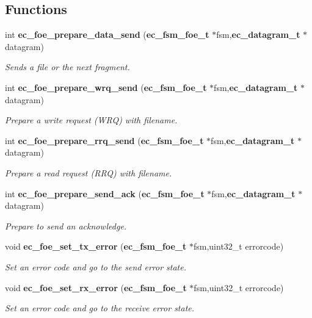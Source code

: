 \subsection*{Functions}
\begin{DoxyCompactItemize}
\item 
int {\bf ec\-\_\-foe\-\_\-prepare\-\_\-data\-\_\-send} ({\bf ec\-\_\-fsm\-\_\-foe\-\_\-t} $\ast$fsm,{\bf ec\-\_\-datagram\-\_\-t} $\ast$datagram)
\begin{DoxyCompactList}\small\item\em Sends a file or the next fragment. \end{DoxyCompactList}\item 
int {\bf ec\-\_\-foe\-\_\-prepare\-\_\-wrq\-\_\-send} ({\bf ec\-\_\-fsm\-\_\-foe\-\_\-t} $\ast$fsm,{\bf ec\-\_\-datagram\-\_\-t} $\ast$datagram)
\begin{DoxyCompactList}\small\item\em Prepare a write request (W\-R\-Q) with filename. \end{DoxyCompactList}\item 
int {\bf ec\-\_\-foe\-\_\-prepare\-\_\-rrq\-\_\-send} ({\bf ec\-\_\-fsm\-\_\-foe\-\_\-t} $\ast$fsm,{\bf ec\-\_\-datagram\-\_\-t} $\ast$datagram)
\begin{DoxyCompactList}\small\item\em Prepare a read request (R\-R\-Q) with filename. \end{DoxyCompactList}\item 
int {\bf ec\-\_\-foe\-\_\-prepare\-\_\-send\-\_\-ack} ({\bf ec\-\_\-fsm\-\_\-foe\-\_\-t} $\ast$fsm,{\bf ec\-\_\-datagram\-\_\-t} $\ast$datagram)
\begin{DoxyCompactList}\small\item\em Prepare to send an acknowledge. \end{DoxyCompactList}\item 
void {\bf ec\-\_\-foe\-\_\-set\-\_\-tx\-\_\-error} ({\bf ec\-\_\-fsm\-\_\-foe\-\_\-t} $\ast$fsm,uint32\-\_\-t errorcode)
\begin{DoxyCompactList}\small\item\em Set an error code and go to the send error state. \end{DoxyCompactList}\item 
void {\bf ec\-\_\-foe\-\_\-set\-\_\-rx\-\_\-error} ({\bf ec\-\_\-fsm\-\_\-foe\-\_\-t} $\ast$fsm,uint32\-\_\-t errorcode)
\begin{DoxyCompactList}\small\item\em Set an error code and go to the receive error state. \end{DoxyCompactList}\item 

\end{DoxyCompactItemize}
